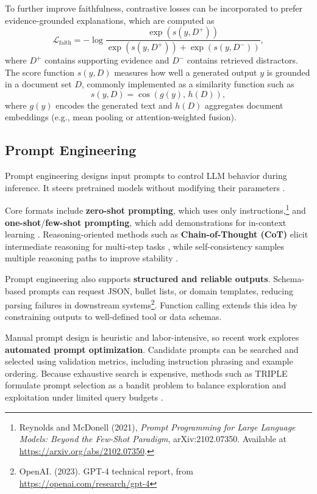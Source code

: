 To further improve faithfulness, contrastive losses can be incorporated to prefer evidence-grounded explanations, which are computed as
\[
\mathcal{L}_{\text{faith}} = -\log \dfrac{\exp(s(y, D^+))}{\exp(s(y, D^+)) + \exp(s(y, D^-))},
\]
where $D^+$ contains supporting evidence and $D^-$ contains retrieved distractors. The score function $s(y, D)$ measures how well a generated output $y$ is grounded in a document set $D$, commonly implemented as a similarity function such as
\[
s(y, D) = \cos\left(g(y), \, h(D)\right),
\]
where $g(y)$ encodes the generated text and $h(D)$ aggregates document embeddings (e.g., mean pooling or attention-weighted fusion).

\subsection{Prompt Engineering}

Prompt engineering designs input prompts to control LLM behavior during inference. It steers pretrained models without modifying their parameters \cite{brown2020language}.

Core formats include \textbf{zero-shot prompting}, which uses only instructions,\footnote{Reynolds and McDonell (2021), \emph{Prompt Programming for Large Language Models: Beyond the Few-Shot Paradigm}, arXiv:2102.07350. Available at \url{https://arxiv.org/abs/2102.07350}.} and \textbf{one-shot}/\textbf{few-shot prompting}, which add demonstrations for in-context learning \cite{brown2020language}. Reasoning-oriented methods such as \textbf{Chain-of-Thought (CoT)} elicit intermediate reasoning for multi-step tasks \cite{wei2022cot}, while self-consistency samples multiple reasoning paths to improve stability \cite{wang2023selfconsistency}.

Prompt engineering also supports \textbf{structured and reliable outputs}. Schema-based prompts can request JSON, bullet lists, or domain templates, reducing parsing failures in downstream systems\footnote{OpenAI. (2023). GPT-4 technical report, from \url{https://openai.com/research/gpt-4}}. Function calling extends this idea by constraining outputs to well-defined tool or data schemas.

Manual prompt design is heuristic and labor-intensive, so recent work explores \textbf{automated prompt optimization}. Candidate prompts can be searched and selected using validation metrics, including instruction phrasing and example ordering. Because exhaustive search is expensive, methods such as TRIPLE formulate prompt selection as a bandit problem to balance exploration and exploitation under limited query budgets \cite{shi2024triple}.

